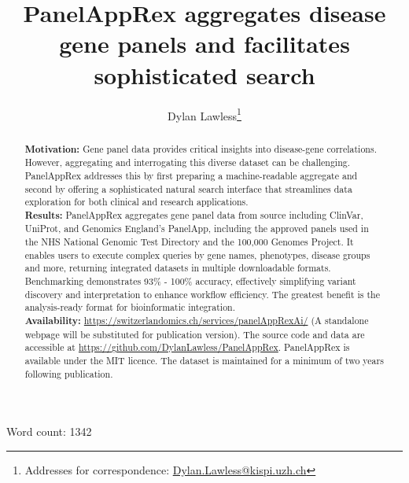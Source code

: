 
\usepackage[printonlyused,withpage,nohyperlinks]{acronym}


\title{PanelAppRex aggregates disease gene panels and facilitates sophisticated search}	
\author[1]{Dylan Lawless\thanks{Addresses for correspondence: \href{mailto:Dylan.Lawless@kispi.uzh.ch}{Dylan.Lawless@kispi.uzh.ch}}}


\maketitle
\justify

\maketitle
Word count: 1342

\begin{abstract}
\noindent
\textbf{Motivation:} Gene panel data provides critical insights into disease-gene correlations. However, aggregating and interrogating this diverse dataset can be challenging. PanelAppRex addresses this by first preparing a machine-readable aggregate and second by offering a sophisticated natural search interface that streamlines data exploration for both clinical and research applications.\\[1ex]
\textbf{Results:} PanelAppRex aggregates gene panel data from source including ClinVar, UniProt, and Genomics England’s PanelApp, including the approved panels used in the NHS National Genomic Test Directory and the 100,000 Genomes Project. It enables users to execute complex queries by gene names, phenotypes, disease groups and more, returning integrated datasets in multiple downloadable formats. Benchmarking demonstrates 
93\% - 100\% accuracy, effectively simplifying variant discovery and interpretation to enhance workflow efficiency. The greatest benefit is the analysis-ready format for bioinformatic integration. \\[1ex]
\noindent \textbf{Availability:} \url{https://switzerlandomics.ch/services/panelAppRexAi/} (A standalone webpage will be substituted for publication version).
The source code and data are accessible at \url{https://github.com/DylanLawless/PanelAppRex}. PanelAppRex is available under the MIT licence. 
The dataset is maintained for a minimum of two years following publication.
\end{abstract}
\clearpage


